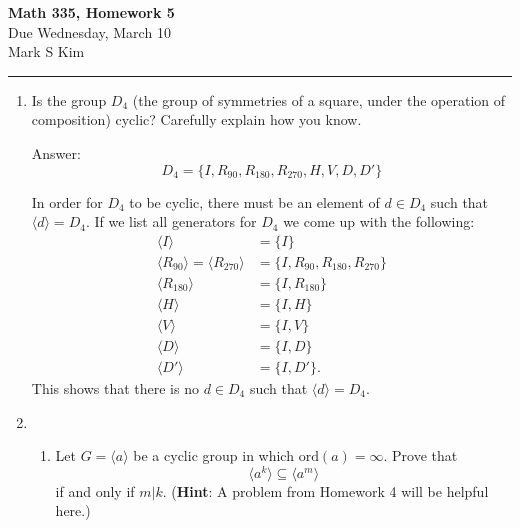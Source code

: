 \documentclass[11pt,twoside]{article}
\begin{document}
\begin{center}
{\bf \Large Math 335, Homework 5}\\
\vspace{0.1in}
{\Large Due Wednesday, March 10}\\
\vspace{0.2cm}
{\large Mark S Kim}
\vspace{0.1cm}
\end{center}

\hrule

\vspace{.2in}

\begin{enumerate}

\item Is the group $D_4$ (the group of symmetries of a square, under the operation of composition) cyclic?  Carefully explain how you know.

{\color{red}Answer:}\\
\[ D_4 = \{ I, R_{90}, R_{180}, R_{270}, H, V, D, D' \} \]

In order for $D_4$ to be cyclic, there must be an element of $d \in D_4$ such that $\langle d \rangle = D_4$.  If we list all generators for $D_4$ we come up with the following:
\begin{align*}
\langle I \rangle &= \{ I \}\\
\langle R_{90} \rangle = \langle R_{270} \rangle  &= \{ I, R_{90}, R_{180}, R_{270} \}\\
\langle R_{180} \rangle &= \{ I, R_{180} \}\\
\langle H \rangle &= \{ I, H \}\\
\langle V \rangle &= \{ I, V \}\\
\langle D \rangle &= \{ I, D \}\\
\langle D' \rangle &= \{ I, D' \}.
\end{align*}
This shows that there is no $d \in D_4$ such that $\langle d \rangle = D_4$.

\vspace{0.5cm}

\item 
\begin{enumerate}

\item Let $G = \langle a \rangle$ be a cyclic group in which $\text{ord}(a) = \infty$.  Prove that
\[\langle a^k \rangle \subseteq \langle a^m \rangle\]
if and only if $m | k$.  ({\bf Hint}: A problem from Homework 4 will be helpful here.)


\end{enumerate}
\end{enumerate}
\end{document}
